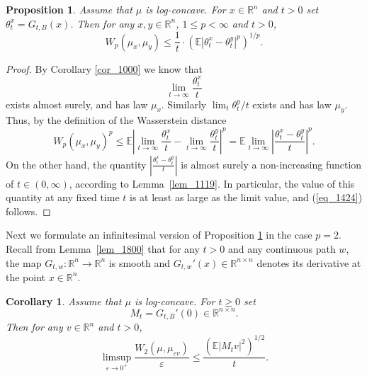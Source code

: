 \documentclass[12pt,a4paper]{article}
\newcommand{\E}{\mathbb{E}}
\newcommand{\EE}{\mathbb{E}}
\newcommand{\RR}{\mathbb{R}}
\newcommand{\R}{\mathbb{R}}
\renewcommand{\epsilon}{\varepsilon}
\newtheorem{proposition}[theorem]{Proposition}
\newtheorem{corollary}[theorem]{Corollary}
\theoremstyle{definition}
\begin{document}
\begin{proposition} \label{prop_1705}
Assume that $\mu$ is log-concave. For $x\in \R^n$
and $t >0$ set $\theta_t^x = G_{t,B} ( x)$. Then for any
$x,y \in \R^n$, $1 \leq p < \infty$ and $t > 0$, 
 \begin{equation} \label{eq_1424} W_p \left(\mu_{x}, \mu_{y} \right) \leq \frac{1}{t} \cdot \left( \EE \left| \theta_t^x - \theta_t^y \right|^p \right)^{1/p}. \end{equation}
\end{proposition}

\begin{proof} By Corollary \ref{cor_1000} we know that
\[
\lim_{t\to \infty} \frac{\theta_t^{x}}{t}
\]
exists almost surely, and has law $\mu_x$. Similarly $\lim_{t} \theta_t^{y} / t$ exists and has law $\mu_y$. Thus, by the definition of the Wasserstein distance
\[
W_p \left(\mu_{x}, \mu_{y} \right)^p \leq
\EE  \left\vert \lim_{t\to \infty} \frac{\theta_t^{x}}{t} - \lim_{t \to \infty} \frac{ \theta_t^{y} }{t} \right\vert^p 
=
\EE \lim_{t\to \infty} \left\vert \frac{\theta_t^{x} -\theta_t^{y} }{t} \right\vert^p .
\]
On the other hand, the quantity
$ \left\vert \frac{\theta_t^{x} - \theta_t^{y}}{t} \right \vert$
is almost surely a non-increasing function of $t \in (0, \infty)$, according 
to Lemma~\ref{lem_1119}.
In particular, the value of this quantity at any fixed time $t$
is at least as large as the limit value, and (\ref{eq_1424}) follows.
\end{proof}
%
Next we formulate an infinitesimal version of Proposition \ref{prop_1705} in the case $p=2$.
Recall from Lemma~\ref{lem_1800}
that for any $t>0$ and any continuous path $w$,
the map $G_{t,w}: \RR^n \rightarrow \RR^n$ is smooth and  $G_{t,w}'(x) \in \RR^{n \times n}$
denotes its derivative at the point $x \in \RR^n$.
%
\begin{corollary} \label{cor_1521}
Assume that $\mu$ is log-concave. For $t \geq 0$ set $$ M_t = G_{t, B}'(0) \in \RR^{n \times n}. $$ 
Then for any $v \in \RR^n$ and $t > 0$,
\begin{equation}
\limsup_{\epsilon \to 0^+} \frac{ W_2 ( \mu , \mu_{\epsilon v} ) }\epsilon
\leq \frac{  ( \E \vert M_t v \vert^2 )^{1/2} } t.
\label{eq_1521}
\end{equation}
\end{corollary}
\end{document}
